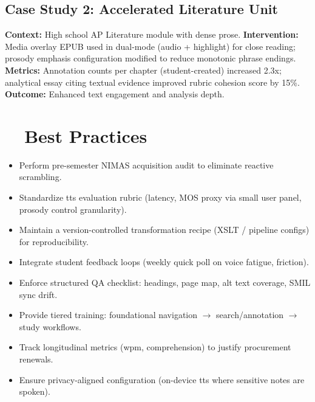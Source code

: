 \subsection{Case Study 2: Accelerated Literature Unit}
\textbf{Context:} High school AP Literature module with dense prose.
\textbf{Intervention:} Media overlay EPUB used in dual-mode (audio + highlight) for close reading; prosody emphasis configuration
modified to reduce monotonic phrase endings.
\textbf{Metrics:} Annotation counts per chapter (student-created) increased 2.3x; analytical essay citing textual evidence improved rubric
cohesion score by 15\%.
\textbf{Outcome:} Enhanced text engagement and analysis depth.

\section{~~Best Practices}\label{ch07:sec:best-practices}
\begin{itemize}
	\item Perform pre-semester NIMAS acquisition audit to eliminate reactive scrambling.
	\item Standardize \gls{tts} evaluation rubric (latency, MOS proxy via small user panel, prosody control granularity).
	\item Maintain a version-controlled transformation recipe (XSLT / pipeline configs) for reproducibility.
	\item Integrate student feedback loops (weekly quick poll on voice fatigue,  friction).
	\item Enforce structured QA checklist: headings, page map, alt text coverage, SMIL sync drift.
	\item Provide tiered training: foundational navigation $\rightarrow$ search/annotation $\rightarrow$ study workflows.
	\item Track longitudinal metrics (wpm, comprehension) to justify procurement renewals.
	\item Ensure privacy-aligned configuration (on-device \gls{tts} where sensitive notes are spoken).
\end{itemize}

